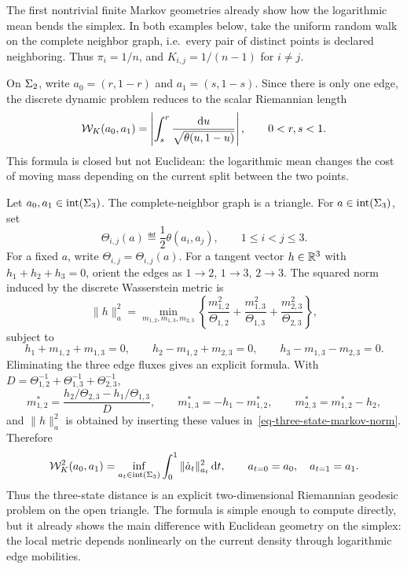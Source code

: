 The first nontrivial finite Markov geometries already show how the logarithmic mean bends the simplex. In both examples below, take the uniform random walk on the complete neighbor graph, i.e.\ every pair of distinct points is declared neighboring. Thus \(\pi_i=1/n\), and \(K_{i,j}=1/(n-1)\) for \(i\neq j\).

\begin{example}
	On \(\Sigma_2\), write \(a_0=(r,1-r)\) and \(a_1=(s,1-s)\). Since there is only one edge, the discrete dynamic problem reduces to the scalar Riemannian length
\begin{equation}
\label{eq-two-state-markov-distance}
\mathcal W_K(a_0,a_1)
=
\left|\int_s^r \frac{\mathrm{d} u}{\sqrt{\theta(u,1-u)}}\right|,
\qquad
0<r,s<1.
\end{equation}
	This formula is closed but not Euclidean: the logarithmic mean changes the cost of moving mass depending on the current split between the two points.
\end{example}
\begin{example}
	Let $a_0,a_1\in\operatorname{int}(\Sigma_3)$. The complete-neighbor graph is a triangle. For \(a\in\operatorname{int}(\Sigma_3)\), set
\[
\Theta_{i,j}(a)\eqdef\frac12\theta(a_i,a_j),
\qquad 1\leq i<j\leq3.
\]
For a fixed \(a\), write \(\Theta_{i,j}=\Theta_{i,j}(a)\).
	For a tangent vector \(h\in\mathbb{R}^3\) with \(h_1+h_2+h_3=0\), orient the edges as \(1\to2\), \(1\to3\), \(2\to3\). The squared norm induced by the discrete Wasserstein metric is
\begin{equation}
\label{eq-three-state-markov-norm}
\|h\|_a^2
=
\min_{m_{1,2},m_{1,3},m_{2,3}}
\left\{
\frac{m_{1,2}^2}{\Theta_{1,2}}+
\frac{m_{1,3}^2}{\Theta_{1,3}}+
\frac{m_{2,3}^2}{\Theta_{2,3}}
\right\},
\end{equation}
subject to
\[
h_1+m_{1,2}+m_{1,3}=0,
\qquad
h_2-m_{1,2}+m_{2,3}=0,
\qquad
h_3-m_{1,3}-m_{2,3}=0.
\]
	Eliminating the three edge fluxes gives an explicit formula. With \(D=\Theta_{1,2}^{-1}+\Theta_{1,3}^{-1}+\Theta_{2,3}^{-1}\),
\[
m_{1,2}^*=\frac{h_2/\Theta_{2,3}-h_1/\Theta_{1,3}}{D},
\qquad
m_{1,3}^*=-h_1-m_{1,2}^*,
\qquad
m_{2,3}^*=m_{1,2}^*-h_2,
\]
and \(\|h\|_a^2\) is obtained by inserting these values in~\eqref{eq-three-state-markov-norm}. Therefore
\begin{equation}
\label{eq-three-state-markov-distance}
\mathcal W_K^2(a_0,a_1)
=
\inf_{a_t\in\operatorname{int}(\Sigma_3)}
\int_0^1\|\dot a_t\|_{a_t}^2\,\mathrm{d} t,
\qquad
a_{t=0}=a_0,
\quad a_{t=1}=a_1.
\end{equation}
	Thus the three-state distance is an explicit two-dimensional Riemannian geodesic problem on the open triangle. The formula is simple enough to compute directly, but it already shows the main difference with Euclidean geometry on the simplex: the local metric depends nonlinearly on the current density through logarithmic edge mobilities.
\end{example}

